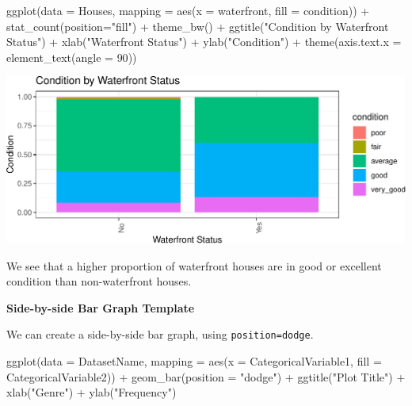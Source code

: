 \documentclass[
  letterpaper,
  DIV=11,
  numbers=noendperiod]{scrreprt}
\newenvironment{Shaded}{\begin{snugshade}}{\end{snugshade}}
\newcommand{\AttributeTok}[1]{\textcolor[rgb]{0.40,0.45,0.13}{#1}}
\newcommand{\DecValTok}[1]{\textcolor[rgb]{0.68,0.00,0.00}{#1}}
\newcommand{\FunctionTok}[1]{\textcolor[rgb]{0.28,0.35,0.67}{#1}}
\newcommand{\NormalTok}[1]{\textcolor[rgb]{0.00,0.23,0.31}{#1}}
\newcommand{\SpecialCharTok}[1]{\textcolor[rgb]{0.37,0.37,0.37}{#1}}
\newcommand{\StringTok}[1]{\textcolor[rgb]{0.13,0.47,0.30}{#1}}
\begin{document}
\begin{Shaded}
\begin{Highlighting}[]
\FunctionTok{ggplot}\NormalTok{(}\AttributeTok{data =}\NormalTok{ Houses, }\AttributeTok{mapping =} \FunctionTok{aes}\NormalTok{(}\AttributeTok{x =}\NormalTok{ waterfront, }\AttributeTok{fill =}\NormalTok{ condition)) }\SpecialCharTok{+}
    \FunctionTok{stat\_count}\NormalTok{(}\AttributeTok{position=}\StringTok{"fill"}\NormalTok{)  }\SpecialCharTok{+}
  \FunctionTok{theme\_bw}\NormalTok{() }\SpecialCharTok{+} \FunctionTok{ggtitle}\NormalTok{(}\StringTok{"Condition by Waterfront Status"}\NormalTok{) }\SpecialCharTok{+} 
  \FunctionTok{xlab}\NormalTok{(}\StringTok{"Waterfront Status"}\NormalTok{) }\SpecialCharTok{+} 
  \FunctionTok{ylab}\NormalTok{(}\StringTok{"Condition"}\NormalTok{) }\SpecialCharTok{+}   
  \FunctionTok{theme}\NormalTok{(}\AttributeTok{axis.text.x =} \FunctionTok{element\_text}\NormalTok{(}\AttributeTok{angle =} \DecValTok{90}\NormalTok{)) }
\end{Highlighting}
\end{Shaded}

\includegraphics{Ch1_files/figure-pdf/unnamed-chunk-28-1.pdf}

We see that a higher proportion of waterfront houses are in good or
excellent condition than non-waterfront houses.

\textbf{Side-by-side Bar Graph Template}

We can create a side-by-side bar graph, using \texttt{position=dodge}.

\begin{Shaded}
\begin{Highlighting}[]
\FunctionTok{ggplot}\NormalTok{(}\AttributeTok{data =}\NormalTok{ DatasetName, }\AttributeTok{mapping =} \FunctionTok{aes}\NormalTok{(}\AttributeTok{x =}\NormalTok{ CategoricalVariable1, }
                                         \AttributeTok{fill =}\NormalTok{ CategoricalVariable2)) }\SpecialCharTok{+}
    \FunctionTok{geom\_bar}\NormalTok{(}\AttributeTok{position =} \StringTok{"dodge"}\NormalTok{) }\SpecialCharTok{+}
  \FunctionTok{ggtitle}\NormalTok{(}\StringTok{"Plot Title"}\NormalTok{) }\SpecialCharTok{+} 
  \FunctionTok{xlab}\NormalTok{(}\StringTok{"Genre"}\NormalTok{) }\SpecialCharTok{+} 
  \FunctionTok{ylab}\NormalTok{(}\StringTok{"Frequency"}\NormalTok{) }
\end{Highlighting}
\end{Shaded}
\end{document}
